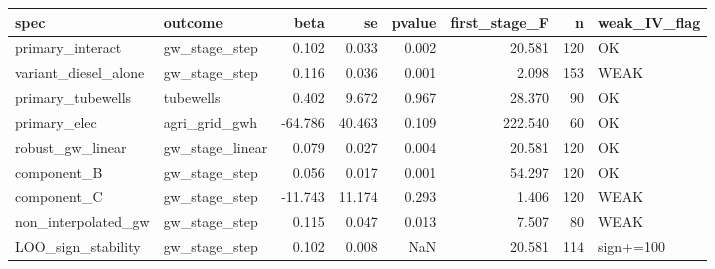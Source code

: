 \begin{tabular}{llrrrrrl}
\toprule
spec & outcome & beta & se & pvalue & first_stage_F & n & weak_IV_flag \\
\midrule
primary_interact & gw_stage_step & 0.102 & 0.033 & 0.002 & 20.581 & 120 & OK \\
variant_diesel_alone & gw_stage_step & 0.116 & 0.036 & 0.001 & 2.098 & 153 & WEAK \\
primary_tubewells & tubewells & 0.402 & 9.672 & 0.967 & 28.370 & 90 & OK \\
primary_elec & agri_grid_gwh & -64.786 & 40.463 & 0.109 & 222.540 & 60 & OK \\
robust_gw_linear & gw_stage_linear & 0.079 & 0.027 & 0.004 & 20.581 & 120 & OK \\
component_B & gw_stage_step & 0.056 & 0.017 & 0.001 & 54.297 & 120 & OK \\
component_C & gw_stage_step & -11.743 & 11.174 & 0.293 & 1.406 & 120 & WEAK \\
non_interpolated_gw & gw_stage_step & 0.115 & 0.047 & 0.013 & 7.507 & 80 & WEAK \\
LOO_sign_stability & gw_stage_step & 0.102 & 0.008 & NaN & 20.581 & 114 & sign+=100%
\bottomrule
\end{tabular}
